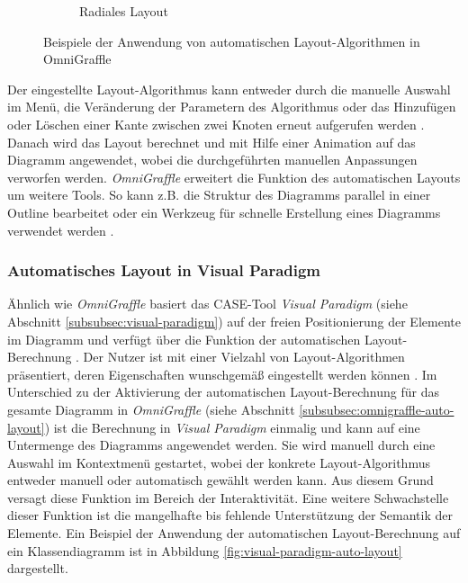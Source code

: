 \begin{figure}[hbt]
\begin{subfigure}{\subfigureshortwidth}
        \caption{Radiales Layout}
        \label{fig:omnigraffle-automatic-layout-f}
    \end{subfigure}
    \caption{Beispiele der Anwendung von automatischen Layout-Algorithmen in OmniGraffle}
    \label{fig:omnigraffle-automatic-layout}
\end{figure}

Der eingestellte Layout-Algorithmus kann entweder durch die manuelle Auswahl im Menü, die Veränderung der Parametern des Algorithmus oder das Hinzufügen oder Löschen einer Kante zwischen zwei Knoten erneut aufgerufen werden \cite[S.43]{Wybrow08Using}. Danach wird das Layout berechnet und mit Hilfe einer Animation auf das Diagramm angewendet, wobei die durchgeführten manuellen Anpassungen verworfen werden. \textit{OmniGraffle} erweitert die Funktion des automatischen Layouts um weitere Tools. So kann z.B. die Struktur des Diagramms parallel in einer Outline bearbeitet oder ein Werkzeug für schnelle Erstellung eines Diagramms verwendet werden \cite{08OmniGraffle}.

\subsubsection{Automatisches Layout in Visual Paradigm}

Ähnlich wie \textit{OmniGraffle} basiert das CASE-Tool \textit{Visual Paradigm} (siehe Abschnitt \ref{subsubsec:visual-paradigm}) auf der freien Positionierung der Elemente im Diagramm und verfügt über die Funktion der automatischen Layout-Berechnung \cite{14Visual}. Der Nutzer ist mit einer Vielzahl von Layout-Algorithmen präsentiert, deren Eigenschaften wunschgemäß eingestellt werden können \cite{Fuhrmann11On-the-Pragmatics}. Im Unterschied zu der Aktivierung der automatischen Layout-Berechnung für das gesamte Diagramm in \textit{OmniGraffle} (siehe Abschnitt \ref{subsubsec:omnigraffle-auto-layout}) ist die Berechnung in \textit{Visual Paradigm} einmalig und kann auf eine Untermenge des Diagramms angewendet werden. Sie wird manuell durch eine Auswahl im Kontextmenü gestartet, wobei der konkrete Layout-Algorithmus entweder manuell oder automatisch gewählt werden kann. Aus diesem Grund versagt diese Funktion im Bereich der Interaktivität. Eine weitere Schwachstelle dieser Funktion ist die mangelhafte bis fehlende Unterstützung der Semantik der Elemente. Ein Beispiel der Anwendung der automatischen Layout-Berechnung auf ein Klassendiagramm ist in Abbildung \ref{fig:visual-paradigm-auto-layout} dargestellt.

